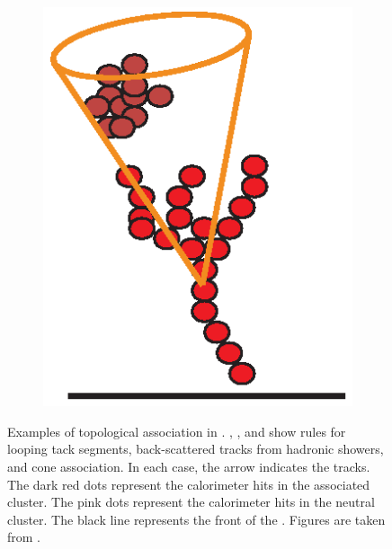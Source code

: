 \begin{figure}[tbph]
\begin{subfigure}[b]{0.3\textwidth}
    \caption{}
    \label{fig:pandoraTopoAssoBackScattered}
  \end{subfigure}
  \begin{subfigure}[b]{0.3\textwidth}
    \includegraphics[width=\textwidth]{pandora/coneAsso}
    \caption{}
    \label{fig:pandoraTopoAssoConeAsso}
  \end{subfigure}
\caption[Topological association in \pandora.]
{Examples of topological association in \pandora. , , and  show rules for looping tack segments, back-scattered tracks from hadronic showers, and cone association. In each case, the arrow indicates the tracks. The dark red dots represent the calorimeter hits in the associated cluster. The pink dots represent the calorimeter hits in the neutral cluster. The black line represents the front of the \ECAL. Figures are taken from \cite{Marshall:pandoraLC}.}
\label{fig:pandoraTopoAsso}
\end{figure}


